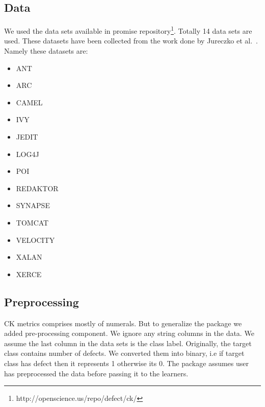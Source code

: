 \documentclass[conference]{IEEEtran}
\begin{document}
\subsection{\textbf{Data}}
 We used the data sets available in promise repository\footnote{http://openscience.us/repo/defect/ck/}. Totally 14 data sets are used. These datasets have been collected from the work done by Jureczko et al.~\cite{jureczko2010towards}. Namely these datasets are:
 \begin{itemize}
 \item ANT
 \item ARC
 \item CAMEL
 \item IVY
 \item JEDIT
 \item LOG4J
 \item POI
 \item REDAKTOR
 \item SYNAPSE
 \item TOMCAT
 \item VELOCITY
 \item XALAN
 \item XERCE
\end{itemize}

\subsection{\textbf{Preprocessing}}
CK metrics comprises mostly of numerals. But to generalize the package we added pre-processing component. We ignore any string columns in the data. We assume the last column in the data sets is the class label. Originally, the target class contains number of defects. We converted them into binary, i.e if target class has defect then it represents 1 otherwise its 0. The package assumes user has preprocessed the data before passing it to the learners. 
\end{document}
